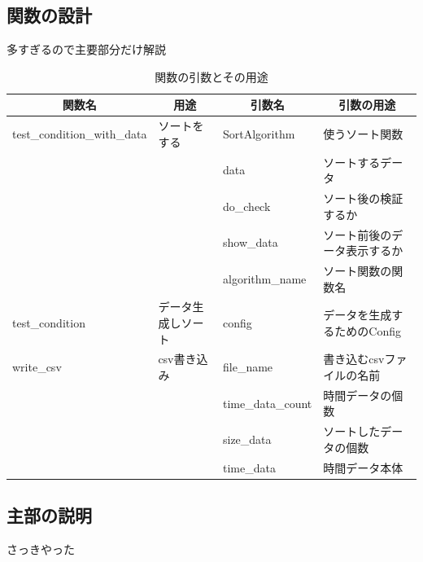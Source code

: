 \documentclass[dvipdfmx, a4paper, titlepage]{jsarticle}
\begin{document}
\subsection{関数の設計}
多すぎるので主要部分だけ解説
\begin{table}[htb]
  \begin{center}
    \caption{関数の引数とその用途}
    \begin{tabular}{|l|l|l|l|}
      \hline
      \multicolumn{1}{|c|}{関数名}   & \multicolumn{1}{c|}{用途} & \multicolumn{1}{c|}{引数名} & \multicolumn{1}{c|}{引数の用途} \\
      \hline
      test\_condition\_with\_data & ソートをする                  & SortAlgorithm            & 使うソート関数                    \\
                                  &                         & data                     & ソートするデータ                   \\
                                  &                         & do\_check                & ソート後の検証するか                 \\
                                  &                         & show\_data               & ソート前後のデータ表示するか             \\
                                  &                         & algorithm\_name          & ソート関数の関数名                  \\
      \hline
      test\_condition             & データ生成しソート               & config                   & データを生成するためのConfig          \\
      \hline
      write\_csv                  & csv書き込み                 & file\_name               & 書き込むcsvファイルの名前             \\
                                  &                         & time\_data\_count        & 時間データの個数                   \\
                                  &                         & size\_data               & ソートしたデータの個数                \\
                                  &                         & time\_data               & 時間データ本体                    \\
      \hline
    \end{tabular}
  \end{center}
\end{table}
\subsection{主部の説明}
さっきやった
\end{document}
